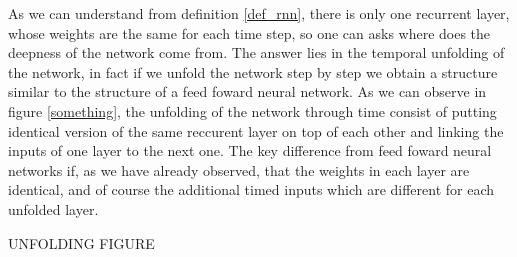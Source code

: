 As we can understand from definition \ref{def_rnn}, there is only one recurrent layer, whose weights are the same for each time step, so one can asks where does the deepness of the network come from.
The answer lies in the temporal unfolding of the network, in fact if we unfold the network step by step we obtain a structure similar to the structure of a feed foward neural network. As we can observe
in figure \ref{something}, the unfolding of the network through time consist of putting identical version of the same reccurent layer on top of each other and linking the inputs of one layer to the
next one. The key difference from feed foward neural networks if, as we have already observed, that the weights in each layer are identical, and of course the additional timed inputs which are different for
each unfolded layer.

UNFOLDING FIGURE








